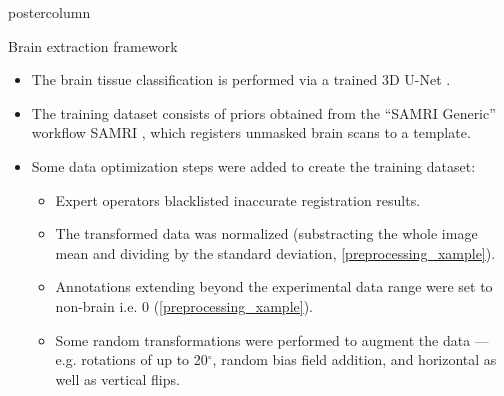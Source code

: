 \begin{frame}
\begin{columns}
\begin{column}{.42\textwidth}
\begin{beamercolorbox}[center]{postercolumn}
\begin{minipage}{.98\textwidth}
{%
                            \begin{myblock}{Brain extraction framework}
                                \begin{itemize}
                                    \item The brain tissue classification is performed via a trained 3D U-Net \cite{ronneberger_u-net:_2015}.
                                    \item The training dataset consists of priors obtained from the “SAMRI Generic” workflow \textcolor{lg}{SAMRI} \cite{irsabi}, which registers unmasked brain scans to a template.
                                    \item Some data optimization steps were added to create the training dataset:
                                    \begin{itemize}
                                        \item Expert operators blacklisted inaccurate registration results.
                                        \item The transformed data was normalized (substracting the whole image mean and dividing by the standard deviation, \cref{preprocessing_xample}).
                                        \item Annotations extending beyond the experimental data range were set to non-brain i.e. 0 (\cref{preprocessing_xample}).
                                        \item Some random transformations were performed to augment the data --- e.g. rotations of up to 20$^{\circ}$, random bias field addition, and horizontal as well as vertical flips.
                                    \end{itemize}
                                \end{itemize}



\end{myblock}}
\end{minipage}
\end{beamercolorbox}
\end{column}
\end{columns}
\end{frame}
